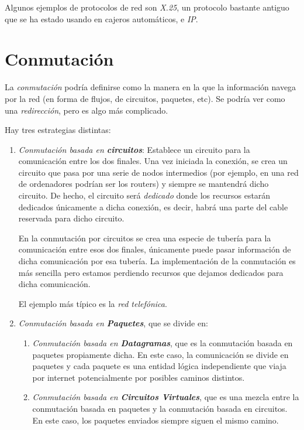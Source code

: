 \documentclass[10pt,a4paper,spanish]{report}
\begin{document}
Algunos ejemplos de protocolos de red son \textit{\textcolor{tema4}{X.25}}, un protocolo bastante antiguo que se ha estado usando en cajeros automáticos, e \textit{\textcolor{tema4}{IP}}. 

\section{\textcolor{tema4}Conmutación}
La \textit{\textcolor{tema4}{conmutación}} podría definirse como la manera en la que la información navega por la red (en forma de flujos, de circuitos, paquetes, etc). Se podría ver como una \textit{\textcolor{tema4}{redirección}}, pero es algo más complicado.

Hay tres estrategias distintas:
\begin{enumerate}[\color{tema4}{$\bigstar$}]
  \item \textit{\textcolor{tema4}{Conmutación basada en \textbf{circuitos}}}: Establece un circuito para la comunicación entre los dos finales. Una vez iniciada la conexión, se crea un circuito que pasa por una serie de nodos intermedios (por ejemplo, en una red de ordenadores podrían ser los routers) y siempre se mantendrá dicho circuito. De hecho, el circuito será \textit{\textcolor{tema4}{dedicado}} donde los recursos estarán dedicados únicamente a dicha conexión, es decir, habrá una parte del cable reservada para dicho circuito. 

  En la conmutación por circuitos se crea una especie de tubería para la comunicación entre esos dos finales, únicamente puede pasar información de dicha comunicación por esa tubería. La implementación de la conmutación es más sencilla pero estamos perdiendo recursos que dejamos dedicados para dicha comunicación.

  El ejemplo más típico es la \textit{\textcolor{tema4}{red telefónica}}.

  \item \textit{\textcolor{tema4}{Conmutación basada en \textbf{Paquetes}}}, que se divide en:
  \begin{enumerate}[\color{tema4}{$\star$}]
    \item \textit{\textcolor{tema4}{Conmutación basada en \textbf{Datagramas}}}, que es la conmutación basada en paquetes propiamente dicha. En este caso, la comunicación se divide en paquetes y cada paquete es una entidad lógica independiente que viaja por internet potencialmente por posibles caminos distintos. 
    \item \textit{\textcolor{tema4}{Conmutación basada en \textbf{Circuitos Virtuales}}}, que es una mezcla entre la conmutación basada en paquetes y la conmutación basada en circuitos. En este caso, los paquetes enviados siempre siguen el mismo camino.
  \end{enumerate}
\end{enumerate}
\end{document}
